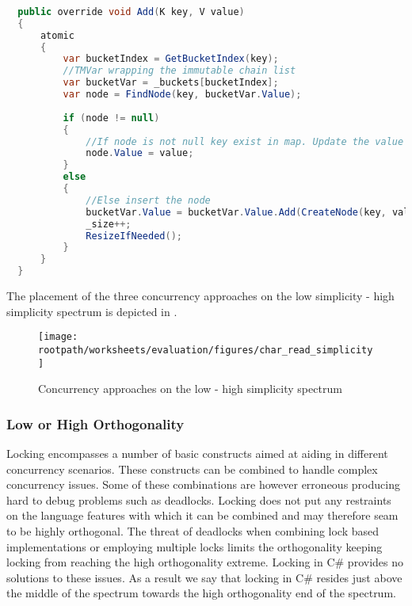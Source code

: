 \begin{lstlisting}[float,label=lst:lang_add_hashmap,
  caption={ConcurrentHashMap \bscode{Add} Method - \stmname},
  language=Java,  
  showspaces=false,
  showtabs=false,
  breaklines=true,
  showstringspaces=false,
  breakatwhitespace=true,
  escapechar=~,
  commentstyle=\color{greencomments},
  keywordstyle=\color{bluekeywords},
  stringstyle=\color{redstrings},
  morekeywords={atomic, retry, orelse, var, get, set, ref, out}]  % Start your code-block
  
  public override void Add(K key, V value)
  {
      atomic
      {
          var bucketIndex = GetBucketIndex(key);
          //TMVar wrapping the immutable chain list
          var bucketVar = _buckets[bucketIndex];
          var node = FindNode(key, bucketVar.Value);
         
          if (node != null)
          {
              //If node is not null key exist in map. Update the value
              node.Value = value;
          }
          else
          {
              //Else insert the node
              bucketVar.Value = bucketVar.Value.Add(CreateNode(key, value));
              _size++;
              ResizeIfNeeded();
          }
      }
  }
\end{lstlisting}

The placement of the three concurrency approaches on the low simplicity - high simplicity spectrum is depicted in .

\begin{figure}[htbp]
\centering
 \texttt{[image: \\rootpath/worksheets/evaluation/figures/char\_read\_simplicity]} 
 \caption{Concurrency approaches on the low - high simplicity spectrum}
\label{fig:char_simplicity}
\end{figure}
\subsubsection{Low or High Orthogonality}\label{subsec:orthogonality}
Locking encompasses a number of basic constructs aimed at aiding in different concurrency scenarios. These constructs can be combined to handle complex concurrency issues. Some of these combinations are however erroneous producing hard to debug problems such as deadlocks. Locking does not put any restraints on the language features with which it can be combined and may therefore seam to be highly orthogonal. The threat of deadlocks when combining lock based implementations or employing multiple locks limits the orthogonality keeping locking from reaching the high orthogonality extreme. Locking in C\# provides no solutions to these issues. As a result we say that locking in C\# resides just above the middle of the spectrum towards the high orthogonality end of the spectrum.

